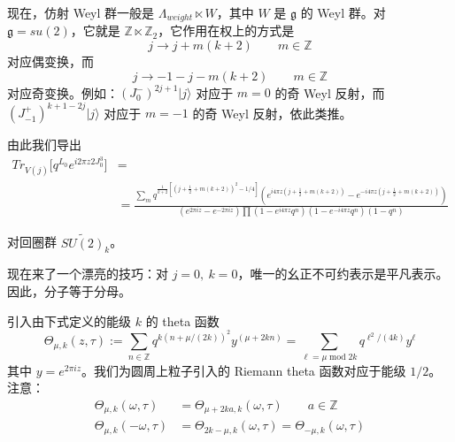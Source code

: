 现在，仿射 Weyl 群一般是 $\Lambda_{weight}\ltimes W$，其中 $W$ 是 $\mathfrak{g}$ 的 Weyl 群。对 $\mathfrak{g}=su(2)$，它就是 $\mathbb{Z}\ltimes\mathbb{Z}_2$，它作用在权上的方式是
\begin{equation}
  j\to j+m(k+2) \qquad m\in\mathbb{Z}
  \tag{4.162}
  \label{eq:4.162}
\end{equation}
对应偶变换，而
\begin{equation}
  j\to -1-j-m(k+2) \qquad m\in\mathbb{Z}
  \tag{4.163}
  \label{eq:4.163}
\end{equation}
对应奇变换。例如：$(J_0^-)^{2j+1}|j\rangle$ 对应于 $m=0$ 的奇 Weyl 反射，而 $(J_{-1}^+)^{k+1-2j}|j\rangle$ 对应于 $m=-1$ 的奇 Weyl 反射，依此类推。

由此我们导出
\begin{equation}
\begin{aligned}
  Tr_{V(j)}\big[q^{L_0}e^{i2\pi z2J_0^3}\big] &= \\
  &= \frac{\sum_m q^{\frac{1}{k+2}\left[(j+\frac12+m(k+2))^2-1/4\right]}
  \left(e^{i4\pi z(j+\frac12+m(k+2))}-e^{-i4\pi z(j+\frac12+m(k+2))}\right)}
  {(e^{2\pi iz}-e^{-2\pi iz})\prod(1-e^{i4\pi z}q^{n})(1-e^{-i4\pi z}q^{n})(1-q^{n})}
\end{aligned}
  \tag{4.164}
  \label{eq:4.164}
\end{equation}


对回圈群 $\widetilde{SU(2)}_k$。

现在来了一个漂亮的技巧：对 $j=0,\ k=0$，唯一的幺正不可约表示是平凡表示。因此，分子等于分母。

引入由下式定义的能级 $k$ 的 theta 函数
\begin{equation}
  \Theta_{\mu,k}(z,\tau):=\sum_{n\in\mathbb{Z}}q^{k(n+\mu/(2k))^2}y^{(\mu+2kn)}
  =\sum_{\ell=\mu\operatorname{mod}2k}q^{\ell^2/(4k)}y^{\ell}
  \tag{4.165}
  \label{eq:4.165}
\end{equation}
其中 $y=e^{2\pi iz}$。我们为圆周上粒子引入的 Riemann theta 函数对应于能级 $1/2$。注意：
\begin{equation}
\begin{aligned}
  \Theta_{\mu,k}(\omega,\tau) &= \Theta_{\mu+2ka,k}(\omega,\tau) \qquad a\in\mathbb{Z}\\
  \Theta_{\mu,k}(-\omega,\tau) &= \Theta_{2k-\mu,k}(\omega,\tau)=\Theta_{-\mu,k}(\omega,\tau)
\end{aligned}
  \tag{4.166}
  \label{eq:4.166}
\end{equation}

